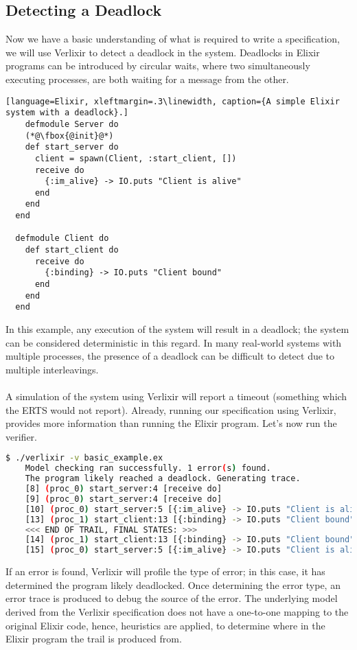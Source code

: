 \subsection{Detecting a Deadlock} \label{sec:deadlock}
Now we have a basic understanding of what is required to write a specification, we will use Verlixir to detect a deadlock in the system. Deadlocks in Elixir programs can be introduced by circular waits, where two simultaneously executing processes, are both waiting for a message from the other. 
\begin{lstlisting}[language=Elixir, xleftmargin=.3\linewidth, caption={A simple Elixir system with a deadlock}.]
    defmodule Server do
    (*@\fbox{@init}@*)
    def start_server do
      client = spawn(Client, :start_client, [])
      receive do
        {:im_alive} -> IO.puts "Client is alive"
      end
    end
  end
  
  defmodule Client do
    def start_client do
      receive do
        {:binding} -> IO.puts "Client bound"
      end
    end
  end  
\end{lstlisting}
In this example, any execution of the system will result in a deadlock; the system can be considered deterministic in this regard. In many real-world systems with multiple processes, the presence of a deadlock can be difficult to detect due to multiple interleavings.
\\ \\
A simulation of the system using Verlixir will report a timeout (something which the ERTS would not report). Already, running our specification using Verlixir, provides more information than running the Elixir program. Let's now run the verifier.
\begin{lstlisting}[language=bash, xleftmargin=.1\linewidth]
    $ ./verlixir -v basic_example.ex
    Model checking ran successfully. 1 error(s) found.
    The program likely reached a deadlock. Generating trace.
    [8] (proc_0) start_server:4 [receive do]
    [9] (proc_0) start_server:4 [receive do]
    [10] (proc_0) start_server:5 [{:im_alive} -> IO.puts "Client is alive"]
    [13] (proc_1) start_client:13 [{:binding} -> IO.puts "Client bound"]
    <<< END OF TRAIL, FINAL STATES: >>>
    [14] (proc_1) start_client:13 [{:binding} -> IO.puts "Client bound"]
    [15] (proc_0) start_server:5 [{:im_alive} -> IO.puts "Client is alive"]
\end{lstlisting}
If an error is found, Verlixir will profile the type of error; in this case, it has determined the program likely deadlocked. Once determining the error type, an error trace is produced to debug the source of the error. The underlying model derived from the Verlixir specification does not have a one-to-one mapping to the original Elixir code, hence, heuristics are applied, to determine where in the Elixir program the trail is produced from.
